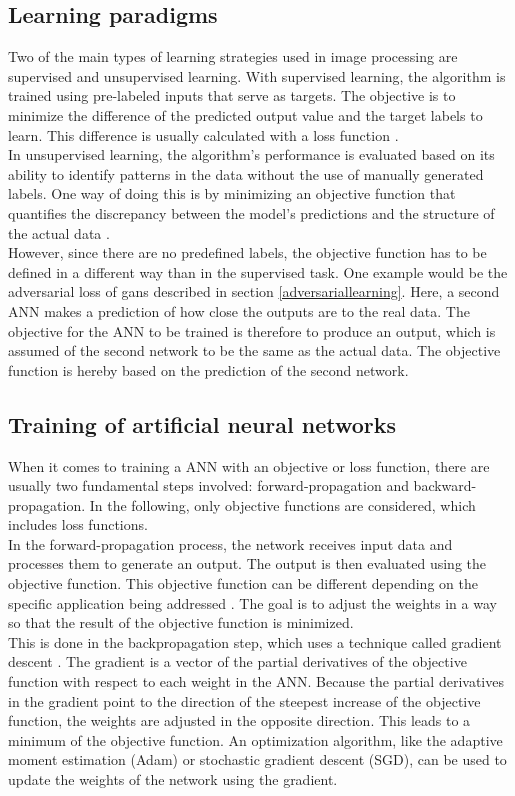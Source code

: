 \subsection{Learning paradigms}
Two of the main types of learning strategies used in image processing are supervised and unsupervised learning.
With supervised learning, the algorithm is trained using pre-labeled inputs that serve as targets.  
The objective is to minimize the difference of the predicted output value and the target labels to learn.
This difference is usually calculated with a loss function \cite{journals/corr/OSheaN15}.\\
In unsupervised learning, the algorithm's performance is evaluated based on its ability to identify patterns in the data without the use of manually generated labels. 
One way of doing this is by minimizing an objective function that quantifies the discrepancy between the model's predictions and the structure of the actual data \cite{journals/corr/OSheaN15}.\\
However, since there are no predefined labels, the objective function has to be defined in a different way than in the supervised task.
One example would be the adversarial loss of \acsp{gan} described in section \ref{adversariallearning}.
Here, a second ANN makes a prediction of how close the outputs are to the real data.
The objective for the ANN to be trained is therefore to produce an output, which is assumed of the second network to be the same as the actual data.
The objective function is hereby based on the prediction of the second network.

\subsection{Training of artificial neural networks}
When it comes to training a ANN with an objective or loss function, there are usually two fundamental steps involved: forward-propagation and backward-propagation.
In the following, only objective functions are considered, which includes loss functions.\\
In the forward-propagation process, the network receives input data and processes them to generate an output.
The output is then evaluated using the objective function. 
This objective function can be different depending on the specific application being addressed \cite[14-16]{aggarwal2018neural}.
The goal is to adjust the weights in a way so that the result of the objective function is minimized.\\
This is done in the backpropagation step, which uses a technique called gradient descent \cite[21-24]{aggarwal2018neural}.
The gradient is a vector of the partial derivatives of the objective function with respect to each weight in the ANN.
Because the partial derivatives in the gradient point to the direction of the steepest increase of the objective function, the weights are adjusted in the opposite direction.
This leads to a minimum of the objective function.
An optimization algorithm, like the adaptive moment estimation (Adam) or stochastic gradient descent (SGD), can be used to update the weights of the network using the gradient.

